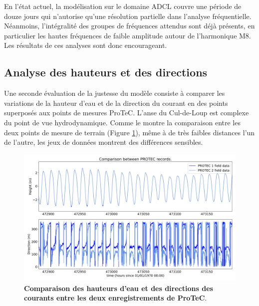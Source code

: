 \documentclass[10pt,a4paper,titlepage]{article}
\begin{document}
En l'état actuel, la modélisation sur le domaine ADCL couvre une période de douze jours qui n'autorise qu'une résolution partielle dans l'analyse fréquentielle.
Néanmoins, l'intégralité des groupes de fréquences attendus sont déjà présents, en particulier les hautes fréquences de faible amplitude autour de l'harmonique M8.
Les résultats de ces analyses sont donc encourageant.


\subsection{Analyse des hauteurs et des directions}
\label{sub:comp_brute}

Une seconde évaluation de la justesse du modèle consiste à comparer les variations de la hauteur d'eau et de la direction du courant en des points superposés aux points de mesures ProTeC.
L'anse du Cul-de-Loup est complexe du point de vue hydrodynamique.
Comme le montre la comparaison entre les deux points de mesure de terrain (Figure \ref{fig:comp_brute_PROTEC_PROTEC}), même à de très faibles distances l'un de l'autre, les jeux de données montrent des différences sensibles.


\begin{figure}[H]
	\centering
	\includegraphics[scale=0.35]{../images/post_traitement/Speed_PROTEC1_PROTEC2.png}
	\caption{
		\textbf{Comparaison des hauteurs d'eau et des directions des courants entre les deux enregistrements de ProTeC}.
	}
	\label{fig:comp_brute_PROTEC_PROTEC}
\end{figure}
\end{document}
